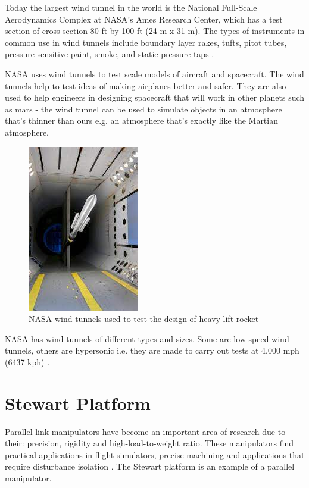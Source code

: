 Today the largest wind tunnel in the world is the National Full-Scale Aerodynamics Complex at NASA's Ames Research Center, which has a test section of cross-section 80 ft by 100 ft (24 m x 31 m). The types of instruments in common use in wind tunnels include boundary layer rakes, tufts, pitot tubes, pressure sensitive paint, smoke, and static pressure taps \cite{morris_force_2010}.

NASA uses wind tunnels to test scale models of aircraft and spacecraft. The wind tunnels help to test ideas of making airplanes better and safer. They are also used to help engineers in designing spacecraft that will work in other planets such as mars - the wind tunnel can be used to simulate objects in an atmosphere that's thinner than ours e.g. an atmosphere that's exactly like the Martian atmosphere. 
\begin{center}
    \begin{figure}[!h]
\centering
\includegraphics{Figures/Fig4}
\caption[NASA Wind tunnel - space application]{NASA wind tunnels used to test the design of heavy-lift rocket \cite{NASA}}
\end{figure}
\end{center}
NASA has wind tunnels of different types and sizes. Some are low-speed wind tunnels, others are hypersonic i.e. they are made to carry out tests at 4,000 mph (6437 kph) \cite{NASA}.
\section{Stewart Platform}
Parallel link manipulators have become an important area of research due to their: precision, rigidity and high-load-to-weight ratio. These manipulators find practical applications in flight simulators, precise machining and applications that require disturbance isolation \cite{iqbal_dynamic_2008}. The Stewart platform is an example of a parallel manipulator.

